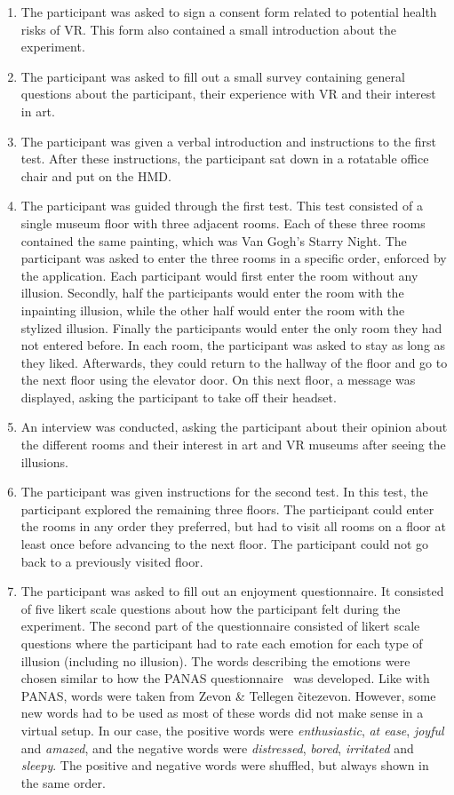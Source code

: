 \documentclass[a4paper]{article}
\begin{document}
\begin{enumerate}
\item The participant was asked to sign a consent form related to potential health risks of VR. This form also contained a small introduction about the experiment.
\item The participant was asked to fill out a small survey containing general questions about the participant, their experience with VR and their interest in art.
\item The participant was given a verbal introduction and instructions to the first test. After these instructions, the participant sat down in a rotatable office chair and put on the HMD.
\item The participant was guided through the first test. This test consisted of a single museum floor with three adjacent rooms. Each of these three rooms contained the same painting, which was Van Gogh's Starry Night. The participant was asked to enter the three rooms in a specific order, enforced by the application. Each participant would first enter the room without any illusion. Secondly, half the participants would enter the room with the inpainting illusion, while the other half would enter the room with the stylized illusion. Finally the participants would enter the only room they had not entered before. In each room, the participant was asked to stay as long as they liked. Afterwards, they could return to the hallway of the floor and go to the next floor using the elevator door. On this next floor, a message was displayed, asking the participant to take off their headset.
\item An interview was conducted, asking the participant about their opinion about the different rooms and their interest in art and VR museums after seeing the illusions.
\item The participant was given instructions for the second test. In this test, the participant explored the remaining three floors. The participant could enter the rooms in any order they preferred, but had to visit all rooms on a floor at least once before advancing to the next floor. The participant could not go back to a previously visited floor.
\item The participant was asked to fill out an enjoyment questionnaire. It consisted of five likert scale questions about how the participant felt during the experiment. The second part of the questionnaire consisted of likert scale questions where the participant had to rate each emotion for each type of illusion (including no illusion). The words describing the emotions were chosen similar to how the PANAS questionnaire~\cite{panas} was developed. Like with PANAS, words were taken from Zevon \& Tellegen \~cite{zevon}. However, some new words had to be used as most of these words did not make sense in a virtual setup. In our case, the positive words were \textit{enthusiastic}, \textit{at ease}, \textit{joyful} and \textit{amazed}, and the negative words were \textit{distressed}, \textit{bored}, \textit{irritated} and \textit{sleepy}. The positive and negative words were shuffled, but always shown in the same order.

\end{enumerate}
\end{document}
